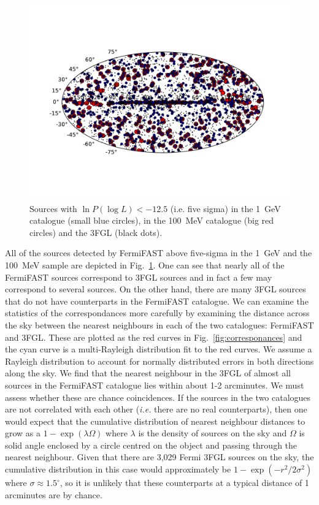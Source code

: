 \documentclass[useAMS,usenatbib]{mn2e}
\begin{document}
\begin{figure}
  \includegraphics[width=\textwidth,clip,trim=0.6in 1in 0.8in
    1in]{source_plot}
  \caption{Sources with $\ln P(\log L)<-12.5$ (i.e. five sigma) in the
    1~GeV catalogue (small blue circles), in the 100~MeV catalogue
    (big red circles) and the 3FGL (black dots).}
  \label{fig:sources}
\end{figure}

All of the sources detected by FermiFAST above five-sigma in the 1~GeV
and the 100~MeV sample are depicted in Fig.~\ref{fig:sources}.  One
can see that nearly all of the FermiFAST sources correspond to 3FGL
sources and in fact a few may correspond to several sources.  On the
other hand, there are many 3FGL sources that do not have counterparts
in the FermiFAST catalogue.  We can examine the statistics of the
correspondances more carefully by examining the distance across the
sky between the nearest neighbours in each of the two catalogues:
FermiFAST and 3FGL.  These are plotted as the red curves in
Fig.~\ref{fig:corresponances} and the cyan curve is a multi-Rayleigh
distribution fit to the red curves.  We assume a Rayleigh distribution
to account for normally distributed errors in both directions along
the sky.  We find that the nearest neighbour in the 3FGL of almost all sources
in the FermiFAST catalogue lies within about 1-2
arcminutes.  We must assess whether these are chance coincidences.  If
the sources in the two catalogues are not correlated with each other
({\em i.e.} there are no real counterparts), then one would expect
that the cumulative distribution of nearest neighbour distances to
grow as a $1-\exp(\lambda \Omega)$ where $\lambda$ is the density of
sources on the sky and $\Omega$ is solid angle enclosed by a circle
centred on the object and passing through the nearest neighbour.
Given that there are 3,029 Fermi 3FGL sources on the sky, the
cumulative distribution in this case would approximately be
$1-\exp(-r^2/2\sigma^2)$ where $\sigma\approx 1.5^\circ$, so it is
unlikely that these counterparts at a typical distance of 1 arcminutes
are by chance.
\end{document}
